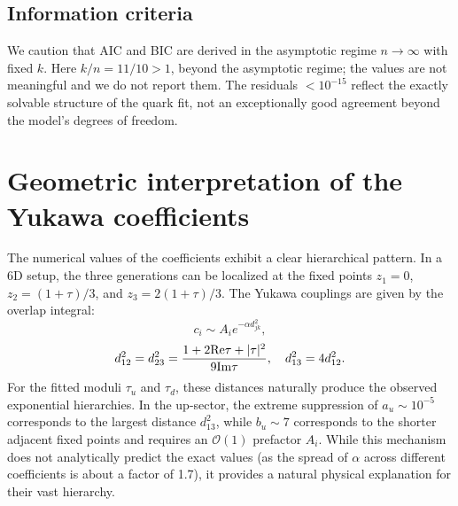 \documentclass[12pt,a4paper]{article}
\numberwithin{equation}{section}
\begin{document}
\subsection{Information criteria}
We caution that AIC and BIC are derived in the asymptotic regime \(n \to \infty\) with fixed \(k\). Here \(k/n = 11/10 > 1\), beyond the asymptotic regime; the values are not meaningful and we do not report them. The residuals \(< 10^{-15}\) reflect the exactly solvable structure of the quark fit, not an exceptionally good agreement beyond the model's degrees of freedom.

\section{Geometric interpretation of the Yukawa coefficients}
The numerical values of the coefficients exhibit a clear hierarchical pattern. In a 6D setup, the three generations can be localized at the fixed points \(z_1 = 0\), \(z_2 = (1 + \tau)/3\), and \(z_3 = 2(1 + \tau)/3\). The Yukawa couplings are given by the overlap integral:
\begin{equation}
c_i\sim A_i e^{-\alpha d_{jk}^2},
\end{equation}
\begin{equation}
d_{12}^2 = d_{23}^2 = \frac{1 + 2{\rm Re}\tau + |\tau|^2}{9{\rm Im}\tau}, \quad d_{13}^2 = 4d_{12}^2.
\end{equation}
For the fitted moduli \(\tau_u\) and \(\tau_d\), these distances naturally produce the observed exponential hierarchies. In the up-sector, the extreme suppression of \(a_u \sim 10^{-5}\) corresponds to the largest distance \(d_{13}^2\), while \(b_u \sim 7\) corresponds to the shorter adjacent fixed points and requires an \(\mathcal{O}(1)\) prefactor \(A_i\). While this mechanism does not analytically predict the exact values (as the spread of \(\alpha\) across different coefficients is about a factor of 1.7), it provides a natural physical explanation for their vast hierarchy.
\end{document}
